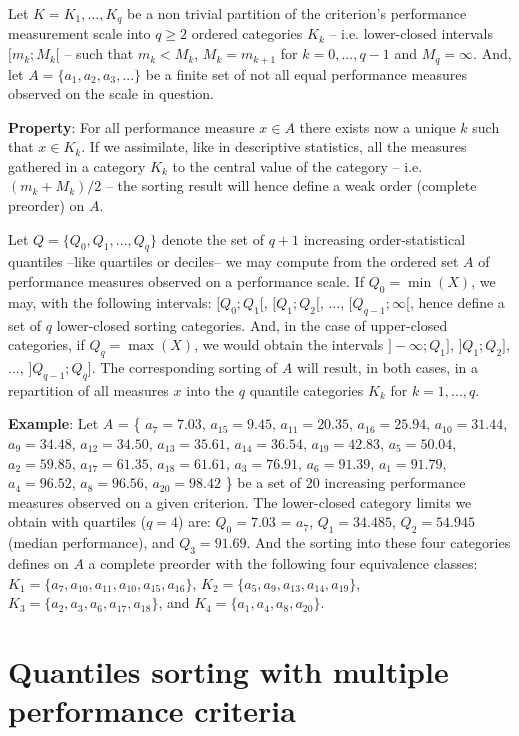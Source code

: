 Let $K = {K_1 , ..., K_q}$ be a non trivial partition of the criterion’s performance measurement scale into $q \geq 2$ ordered categories $K_k$ – i.e. lower-closed intervals $[m_k ; M_k[$ – such that $m_k < M_k$, $M_k = m_{k+1}$ for $k = 0, ..., q - 1$ and $M_q = \infty$. And, let $A=\{a_1 , a_2 , a_3 , ...\}$ be a finite set of not all equal performance measures observed on the scale in question.

\textbf{Property}: For all performance measure $x \in A$ there exists now a unique $k$ such that $x \in K_k$. If we assimilate, like in descriptive statistics, all the measures gathered in a category $K_k$ to the central value of the category – i.e. $(m_k + M_k)/2$ – the sorting result will hence define a weak order (complete preorder) on $A$.

Let $Q=\{Q_0 , Q_1 , ..., Q_q\}$ denote the set of $q + 1$ increasing order-statistical quantiles –like quartiles or deciles– we may compute from the ordered set $A$ of performance measures observed on a performance scale. If $Q_0 = \min(X)$, we may, with the following intervals: $[Q_0 ; Q_1 [$, $[Q_1 ; Q_2 [$, ..., $[Q_{q-1}; \infty[$, hence define a set of $q$ lower-closed sorting categories. And, in the case of upper-closed categories, if $Q_q = \max(X)$, we would obtain the intervals $] -\infty; Q_1]$, $]Q_1 ; Q_2]$, ..., $]Q_{q-1} ; Q_q]$. The corresponding sorting of $A$ will result, in both cases, in a repartition of all measures $x$ into the $q$ quantile categories $K_k$ for $k = 1, ..., q$.

\textbf{Example}: Let $A$ = \{ $a_7 = 7.03$, $a_{15}=9.45$, $a_{11}= 20.35$, $a_{16}= 25.94$, $a_{10}= 31.44$, $a_9= 34.48$, $a_{12}= 34.50$, $a_{13}= 35.61$, $a_{14}= 36.54$, $a_{19}= 42.83$, $a_5= 50.04$, $a_2= 59.85$, $a_{17}= 61.35$, $a_{18}= 61.61$, $a_3= 76.91$, $a_6= 91.39$, $a_1= 91.79$, $a_4= 96.52$, $a_8= 96.56$, $a_{20}= 98.42$ \} be a set of 20 increasing performance measures observed on a given criterion. The lower-closed category limits we obtain with quartiles ($q = 4$) are: $Q_0 = 7.03$ = $a_7$, $Q_1= 34.485$, $Q_2= 54.945$ (median performance), and $Q_3= 91.69$. And the sorting into these four categories defines on $A$ a complete preorder with the following four equivalence classes: $K_1=\{a_7,a_{10},a_{11},a_{10},a_{15},a_{16}\}$, $K_2=\{a_5,a_9,a_{13},a_{14},a_{19}\}$, $K_3=\{a_2,a_3,a_6,a_{17},a_{18}\}$, and $K_4=\{a_1,a_4,a_8,a_{20}\}$.

\section{Quantiles sorting with multiple performance criteria}
\label{sec:9.2}


